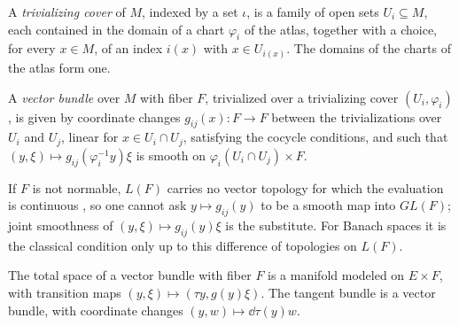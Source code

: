 \begin{definition}
  \label{def:trivialization-cover}
  \leanok
  A \emph{trivializing cover} of $M$, indexed by a set $\iota$, is a family of open sets
  $U_i \subseteq M$, each contained in the domain of a chart $\varphi_i$ of the atlas, together
  with a choice, for every $x \in M$, of an index $i(x)$ with $x \in U_{i(x)}$. The domains of
  the charts of the atlas form one.
\end{definition}

\begin{definition}
  \label{def:vector-bundle}
  \leanok
  A \emph{vector bundle} over $M$ with fiber $F$, trivialized over a trivializing cover
  $(U_i, \varphi_i)$, is given by coordinate changes $g_{ij}(x) \colon F \to F$ between the
  trivializations over $U_i$ and $U_j$, linear for $x \in U_i \cap U_j$, satisfying the cocycle
  conditions, and such that $(y, \xi) \mapsto g_{ij}(\varphi_i^{-1} y)\xi$ is smooth on
  $\varphi_i(U_i \cap U_j) \times F$.
\end{definition}

If $F$ is not normable, $L(F)$ carries no vector topology for which the evaluation is continuous
\cite[Satz 1]{Mai63},
so one cannot ask $y \mapsto g_{ij}(y)$ to be a smooth map into $GL(F)$; joint smoothness of
$(y, \xi) \mapsto g_{ij}(y)\xi$ is the substitute. For Banach spaces it is the classical
condition only up to this difference of topologies on $L(F)$.

\begin{theorem}
  \label{thm:vector-bundle-manifold}
  \leanok
  The total space of a vector bundle with fiber $F$ is a manifold modeled on $E \times F$, with
  transition maps $(y, \xi) \mapsto (\tau y, g(y)\xi)$. The tangent bundle is a vector bundle,
  with coordinate changes $(y, w) \mapsto \dd\tau(y) w$.
\end{theorem}

